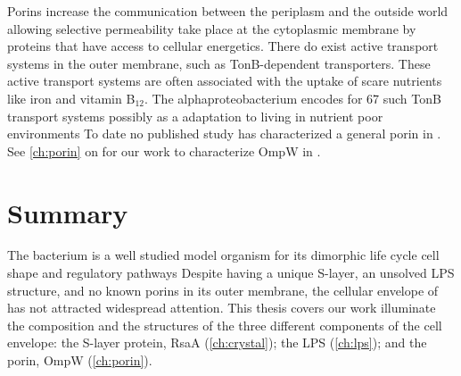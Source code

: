 Porins increase the communication between the periplasm and the outside world allowing selective permeability take place at the cytoplasmic membrane by proteins that have access to cellular energetics. There do exist active transport systems in the outer membrane, such as TonB-dependent transporters. These active transport systems are often associated with the uptake of scare nutrients like iron and vitamin B$_{12}$. The alphaproteobacterium \caulobacter{} encodes for 67 such TonB transport systems possibly as a adaptation to living in nutrient poor environments To date no published study has characterized a general porin in \caulobacter{}. See \cref{ch:porin} on  for our work to characterize OmpW in \caulobacter{}.

 \section{Summary}\label{sec:summary} 
The bacterium \caulobacter is a well studied model organism for its dimorphic
life cycle cell shape and regulatory pathways Despite having a unique \ac{S-layer}, an unsolved \ac{LPS} structure, and no known porins in its outer membrane, the cellular envelope of \caulobacter has not attracted widespread attention. This thesis covers our work illuminate the composition and the structures of the three different components of the \caulobacter cell envelope: the \ac{S-layer} protein, RsaA (\cref{ch:crystal}); the \ac{LPS} (\cref{ch:lps}); and the porin, OmpW (\cref{ch:porin}). 


